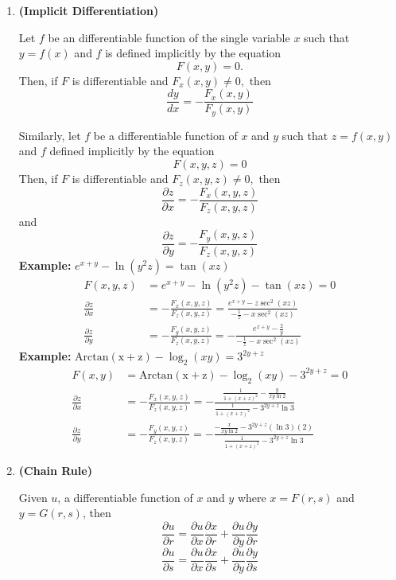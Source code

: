 \documentclass{article}
\begin{document}
\begin{enumerate}[start=1,label={\bfseries Theorem \arabic*:}, wide = 0pt]
\item \textbf{(Implicit Differentiation)}

Let $f$ be an differentiable function of the single variable $x$ such that $y=f(x)$ and $f$ is defined implicitly by the equation
\[F(x,y)=0.\]
Then, if $F$ is differentiable and $F_x(x,y) \neq 0,$ then 
\[\frac{dy}{dx}=-\frac{F_x(x,y)}{F_y(x,y)}\]

Similarly, let $f$ be a differentiable function of $x$ and $y$ such that $z=f(x,y)$ and $f$ defined implicitly by the equation
\[F(x,y,z)=0\]
Then, if $F$ is differentiable and $F_z(x,y,z) \neq 0,$ then 
\[\frac{\partial z}{\partial x}= -\frac{F_x(x,y,z)}{F_z(x,y,z)}\]
and
\[\frac{\partial z}{\partial y}= -\frac{F_y(x,y,z)}{F_z(x,y,z)}\]
\textbf{Example: } $e^{x+y} - \ln{\left( y^2z \right)}=\tan (xz)$
\begin{align*}
    F(x,y,z) &= e^{x+y} - \ln{\left( y^2z \right)} - \tan (xz) = 0 \\
    \frac{\partial z}{\partial x} &= -\frac{F_x(x,y,z)}{F_z(x,y,z)} =\frac{e^{x+y}-z\sec^2{(xz)}}{-\frac{1}{z}-x\sec^2{(xz)}} \\
    \frac{\partial z}{\partial y} &= -\frac{F_y(x,y,z)}{F_z(x,y,z)} = -\frac{e^{x+y}-\frac{2}{y}}{-\frac{1}{z}-x\sec^2(xz)}
\end{align*}
\textbf{Example: } $\operatorname{Arctan (x+z)} - \log_2(xy) = 3^{2y + z}$
\begin{align*}
    F(x,y) &= \operatorname{Arctan (x+z)} - \log_2(xy) - 3^{2y + z} = 0 \\
    \frac{\partial z}{\partial x} &= -\frac{F_x(x,y,z)}{F_z(x,y,z)}= -\frac{\frac{1}{1+(x+z)^2}-\frac{y}{xy \ln 2}}{\frac{1}{1 + (x + z)^2}-3^{2y+z}\ln3} \\
    \frac{\partial z}{\partial y} &= -\frac{F_y(x,y,z)}{F_z(x,y,z)} = -\frac{-\frac{x}{xy \ln 2}-3^{2y+z}(\ln 3) (2)}{\frac{1}{1+(x+z)^2}-3^{2y+z} \ln 3}
\end{align*}
\item \textbf{(Chain Rule)}

Given $u$, a differentiable function of $x$ and $y$ where $x=F(r,s)$ and $y=G(r,s)$, then 
\[\frac{\partial u}{\partial r} = \frac{\partial u}{\partial x} \frac{\partial x}{\partial r} + \frac{\partial u}{\partial y} \frac{\partial y}{\partial r}\]
\[\frac{\partial u}{\partial s} = \frac{\partial u}{\partial x} \frac{\partial x}{\partial s} + \frac{\partial u}{\partial y} \frac{\partial y}{\partial s}\]


\end{enumerate}
\end{document}

